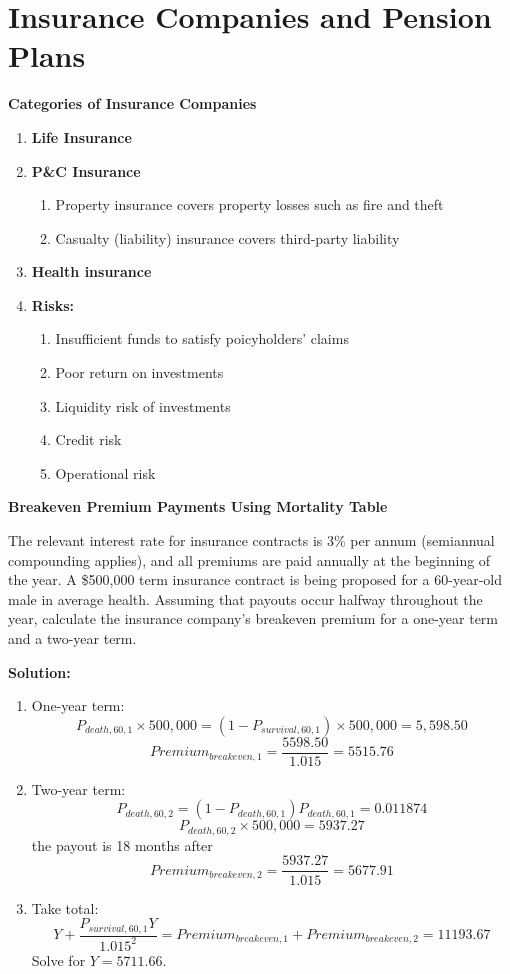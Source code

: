 \documentclass[11pt,fleqn]{report} %
\numberwithin{equation}{section} %
\numberwithin{figure}{section} %
\numberwithin{table}{section} %
\begin{document}
\chapter{Insurance Companies and Pension Plans}
\begin{definition}\textbf{Categories of Insurance Companies}
\begin{enumerate}
    \item \textbf{Life Insurance}
    \item \textbf{P\&C Insurance}
    \begin{enumerate}
        \item Property insurance covers property losses such as fire and theft
        \item Casualty (liability) insurance covers third-party liability
    \end{enumerate}
    \item \textbf{Health insurance}
    \item \textbf{Risks:}
    \begin{enumerate}
        \item Insufficient funds to satisfy poicyholders' claims
        \item Poor return on investments
        \item Liquidity risk of investments
        \item Credit risk
        \item Operational risk
    \end{enumerate}
\end{enumerate}
\end{definition}
\begin{exercise}\textbf{Breakeven Premium Payments Using Mortality Table}

The relevant interest rate for insurance contracts is 3\% per annum (semiannual
compounding applies), and all premiums are paid annually at the beginning of the year.
A \$500,000 term insurance contract is being proposed for a 60-year-old male in average
health. Assuming that payouts occur halfway throughout the year, calculate the insurance
company’s breakeven premium for a one-year term and a two-year term.

\textbf{Solution:}
\begin{enumerate}
    \item One-year term:
    $$
    P_{death,60,1}\times 500,000=(1-P_{survival,60,1})\times 500,000=5,598.50
    $$
    $$
    Premium_{breakeven,1}=\frac{5598.50}{1.015}=5515.76
    $$
    \item Two-year term:
    $$
    P_{death,60,2}=(1-P_{death,60,1})P_{death,60,1}=0.011874
    $$
    $$
    P_{death,60,2}\times 500,000=5937.27
    $$
    the payout is 18 months after
    $$
    Premium_{breakeven,2}=\frac{5937.27}{1.015}=5677.91
    $$
    \item Take total:
    $$
    Y+\frac{P_{survival,60,1}Y}{1.015^2}=Premium_{breakeven,1}+Premium_{breakeven,2}=11193.67
    $$
    Solve for $Y=5711.66$.
\end{enumerate}
\end{exercise}
\end{document}
